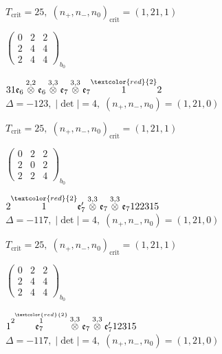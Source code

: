 \documentclass[10pt]{article}
\begin{document}
\hspace{1em}$T_{\text{crit}}=25,\; (n_+,n_-,n_0)_{\text{crit}}=(1,21,1)$

\hspace{2em}$\left(\begin{smallmatrix}0 & 2 & 2 \\ 2 & 4 & 4 \\ 2 & 4 & 4\end{smallmatrix}\right)_{\!b_0}$

\smallskip

$31\mathfrak{e}_6\overset{2,2}{\otimes}\mathfrak{e}_6\overset{3,3}{\otimes}\mathfrak{e}_7\overset{3,3}{\otimes}\mathfrak{e}_7\overset{\textcolor{red}{2}}{1}2$ \quad $\Delta=-123,\; |\det|=4,\; (n_+,n_-,n_0)=(1,21,0)$

\hspace{1em}$T_{\text{crit}}=25,\; (n_+,n_-,n_0)_{\text{crit}}=(1,21,1)$

\hspace{2em}$\left(\begin{smallmatrix}0 & 2 & 2 \\ 2 & 0 & 2 \\ 2 & 2 & 4\end{smallmatrix}\right)_{\!b_0}$

\smallskip

$2\overset{\textcolor{red}{2}}{1}\mathfrak{e}_7'\overset{3,3}{\otimes}\mathfrak{e}_7\overset{3,3}{\otimes}\mathfrak{e}_7122315$ \quad $\Delta=-117,\; |\det|=4,\; (n_+,n_-,n_0)=(1,21,0)$

\hspace{1em}$T_{\text{crit}}=25,\; (n_+,n_-,n_0)_{\text{crit}}=(1,21,1)$

\hspace{2em}$\left(\begin{smallmatrix}0 & 2 & 2 \\ 2 & 4 & 4 \\ 2 & 4 & 4\end{smallmatrix}\right)_{\!b_0}$

\smallskip

$1\overset{2\overset{\textcolor{red}{2}}{1}}{\mathfrak{e}_7}\overset{3,3}{\otimes}\mathfrak{e}_7\overset{3,3}{\otimes}\mathfrak{e}_7'12315$ \quad $\Delta=-117,\; |\det|=4,\; (n_+,n_-,n_0)=(1,21,0)$
\end{document}
